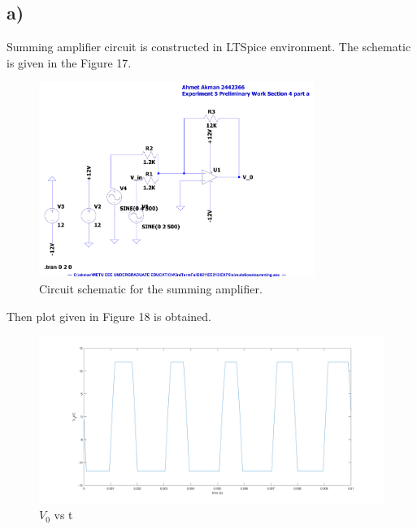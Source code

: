 \documentclass[letterpaper,12pt]{article}
\begin{document}
\subsection{a)}
Summing amplifier circuit is constructed in LTSpice environment. The schematic is given in the Figure 17.
\begin{figure}[H]
	\centering
   \includegraphics[width=0.8\textwidth]{summing_SCH.pdf}
   \caption{Circuit schematic for the summing amplifier.}
\end{figure} 
Then plot given in Figure 18 is obtained.
\begin{figure}[H]
	\centering
   \includegraphics[width=1\textwidth]{4a_vs_t.png}
   \caption{\(V_0\) vs t}
\end{figure}
\end{document}
